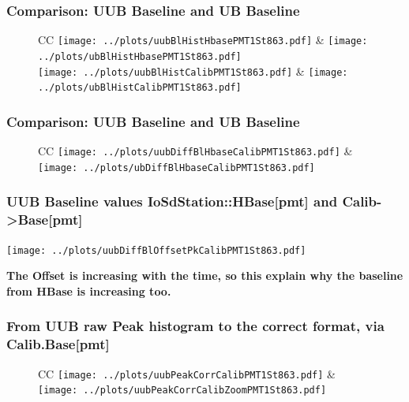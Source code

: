\documentclass[aspectratio=169]{beamer}
\begin{document}
\begin{frame}
	\frametitle{Comparison: UUB Baseline and UB Baseline}
	\begin{figure}
		\centering
		\begin{tabularx}{\textwidth}{CC}
			\texttt{[image: ../plots/uubBlHistHbasePMT1St863.pdf]}
			&
			\texttt{[image: ../plots/ubBlHistHbasePMT1St863.pdf]}
			\\
			\texttt{[image: ../plots/uubBlHistCalibPMT1St863.pdf]}
			&
			\texttt{[image: ../plots/ubBlHistCalibPMT1St863.pdf]}
		\end{tabularx}
	\end{figure}
\end{frame}


\begin{frame}
	\frametitle{Comparison: UUB Baseline and UB Baseline}
	\begin{figure}
		\centering
		\begin{tabularx}{\textwidth}{CC}
			\texttt{[image: ../plots/uubDiffBlHbaseCalibPMT1St863.pdf]}
			&
			\texttt{[image: ../plots/ubDiffBlHbaseCalibPMT1St863.pdf]}
		\end{tabularx}
	\end{figure}
\end{frame}


\begin{frame}
	\frametitle{UUB Baseline values IoSdStation::HBase[pmt] and Calib->Base[pmt]}
	\centering
	\texttt{[image: ../plots/uubDiffBlOffsetPkCalibPMT1St863.pdf]}
	\vspace{0.2cm}

	{\bf The Offset is increasing with the time, so this explain why the baseline 
	from HBase is increasing too.}
\end{frame}


\begin{frame}
	\frametitle{From UUB raw Peak histogram to the correct format, via Calib.Base[pmt]}
	\begin{figure}
		\centering
		\begin{tabularx}{\textwidth}{CC}
			\texttt{[image: ../plots/uubPeakCorrCalibPMT1St863.pdf]}
			&
			\texttt{[image: ../plots/uubPeakCorrCalibZoomPMT1St863.pdf]}
			\\
		\end{tabularx}
	\end{figure}
\end{frame}
\end{document}
